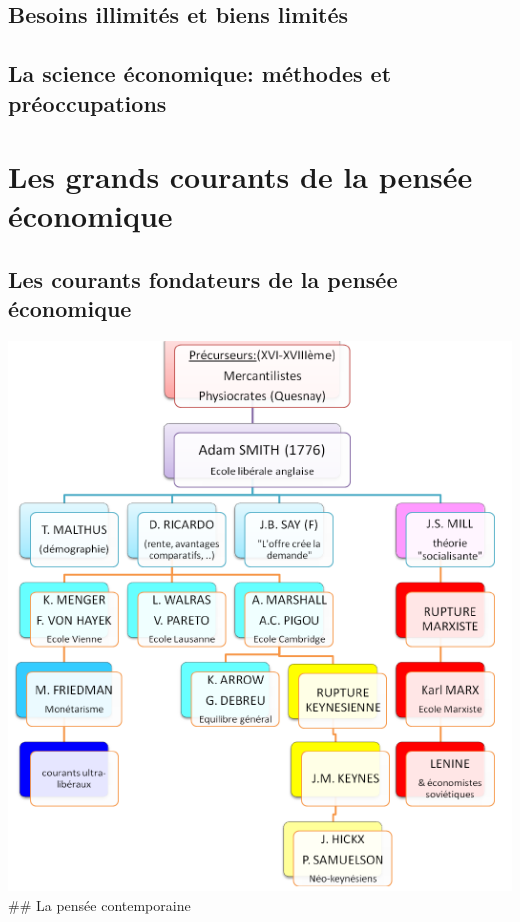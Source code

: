 \documentclass[
]{book}
\begin{document}
\hypertarget{besoins-illimituxe9s-et-biens-limituxe9s}{%
\section{Besoins illimités et biens limités}\label{besoins-illimituxe9s-et-biens-limituxe9s}}

\hypertarget{la-science-uxe9conomique-muxe9thodes-et-pruxe9occupations}{%
\section{La science économique: méthodes et préoccupations}\label{la-science-uxe9conomique-muxe9thodes-et-pruxe9occupations}}

\hypertarget{les-grands-courants-de-la-pensuxe9e-uxe9conomique}{%
\chapter{Les grands courants de la pensée économique}\label{les-grands-courants-de-la-pensuxe9e-uxe9conomique}}

\hypertarget{les-courants-fondateurs-de-la-pensuxe9e-uxe9conomique}{%
\section{Les courants fondateurs de la pensée économique}\label{les-courants-fondateurs-de-la-pensuxe9e-uxe9conomique}}

\includegraphics{_book/Book_files/figure-html/Syst_Eco.png}
\#\# La pensée contemporaine
\end{document}
